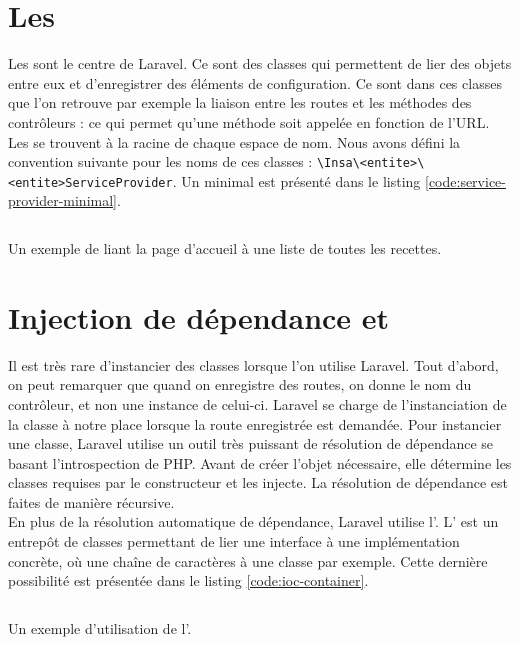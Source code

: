 \section{Les \servicesProvider{}}
	Les \servicesProvider{} sont le centre de Laravel. Ce sont des classes qui permettent de lier des objets entre eux et d'enregistrer des éléments de configuration. Ce sont dans ces classes que l'on retrouve par exemple la liaison entre les routes et les méthodes des contrôleurs : ce qui permet qu'une méthode soit appelée en fonction de l'URL.\\

	Les \servicesProvider{} se trouvent à la racine de chaque espace de nom. Nous avons défini la convention suivante pour les noms de ces classes : \verb|\Insa\<entite>\<entite>ServiceProvider|. Un \serviceProvider{} minimal est présenté dans le listing \ref{code:service-provider-minimal}.
	\begin{listing}[H]
		\inputminted{php}{code/serviceProvider.php}
		\caption{Un exemple de \serviceProvider{} liant la page d'accueil à une liste de toutes les recettes.}
		\label{code:service-provider-minimal}
	\end{listing}

\section{Injection de dépendance et \ioc{}}
	Il est très rare d'instancier des classes lorsque l'on utilise Laravel. Tout d'abord, on peut remarquer que quand on enregistre des routes, on donne le nom du contrôleur, et non une instance de celui-ci. Laravel se charge de l'instanciation de la classe à notre place lorsque la route enregistrée est demandée. Pour instancier une classe, Laravel utilise un outil très puissant de résolution de dépendance se basant l'introspection de PHP. Avant de créer l'objet nécessaire, elle détermine les classes requises par le constructeur et les injecte. La résolution de dépendance est faites de manière récursive.\\

	En plus de la résolution automatique de dépendance, Laravel utilise l'\ioc{}. L'\ioc{} est un entrepôt de classes permettant de lier une interface à une implémentation concrète, où une chaîne de caractères à une classe par exemple. Cette dernière possibilité est présentée dans le listing \ref{code:ioc-container}.

	\begin{listing}[H]
		\inputminted{php}{code/iocContainer.php}
		\caption{Un exemple d'utilisation de l'\ioc{}.}
		\label{code:ioc-container}
	\end{listing}

